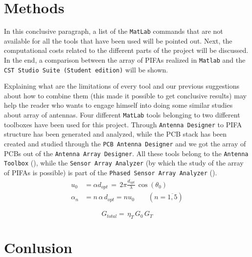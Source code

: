 \documentclass[10pt,a4paper,twocolumn]{article}
\begin{document}
{\section*{Methods}
In this conclusive paragraph, a list of the \texttt{\color{BurntOrange}MatLab} commands that are not available for all the tools that have been used will be pointed out. Next, the computational costs related to the different parts of the project will be discussed. In the end, a comparison between the array of PIFAs realized in \texttt{\color{BurntOrange}Matlab} and the \texttt{\color{Periwinkle}CST Studio Suite (Student edition)} will be shown. 

\indent Explaining what are the limitations of every tool and our previous suggestions about how to combine them (this made it possible to get conclusive results) may help the reader who wants to engage himself into doing some similar studies about array of antennas. Four different \texttt{\color{BurntOrange}MatLab} tools belonging to two different toolboxes have been used for this project. Through \texttt{\color{Mahogany}Antenna Designer} to PIFA structure has been generated and analyzed, while the PCB stack has been created and studied through the \texttt{\color{Mahogany}PCB Antenna Designer} and we got the array of PCBs out of the \texttt{\color{Mahogany}Antenna Array Designer}. All these tools belong to the \texttt{\color{ForestGreen}Antenna Toolbox} (\textbf{\cite{AntennaToolbox}}), while the \texttt{\color{Mahogany}Sensor Array Analyzer} (by which the study of the array of PIFAs is possible) is part of the \texttt{\color{ForestGreen}Phased Sensor Array Analyzer} (\textbf{\cite{PhasedArraySystemToolbox}}). 
\begin{equation}
	\begin{aligned}
		u_0&=\alpha d_{opt}\,=\,2\pi\frac{d_{opt}}{\lambda}\,\cos(\theta_0)\\
		\alpha_n&=n\,\alpha\,d_{opt}=nu_0\qquad \left(n=\overline{1,5}\right)
		\label{eq:phase coefficients}
	\end{aligned}
\end{equation}

\begin{equation}
	G_{total}=\,\eta_T\,G_0\,G_T
	\label{eq:pattern multiplication}
\end{equation}

\section*{Conlusion}

}
\end{document}

